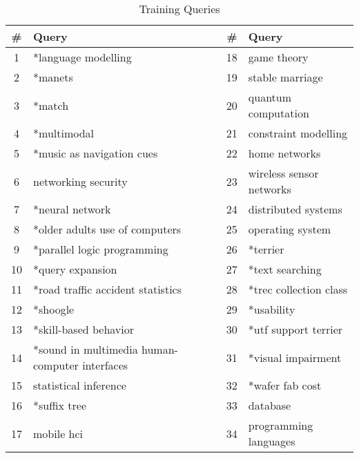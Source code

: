 \begin{table}
\centering
\begin{tabular}{|c|l|c|l|}
\hline \textbf{\#} & \textbf{Query} & \textbf{\#} & \textbf{Query} \\
\hline 1 & *language modelling & 18 & game theory\\
\hline 2 & *manets & 19 & stable marriage \\
\hline 3  & *match & 20 & quantum computation\\ 
\hline 4  & *multimodal & 21 & constraint modelling\\ 
\hline 5  & *music as navigation cues & 22 & home networks\\ 
\hline 6  & networking security & 23 & wireless sensor networks\\ 
\hline 7  & *neural network & 24 & distributed systems\\ 
\hline 8  & *older adults use of computers & 25 & operating system\\ 
\hline 9  & *parallel logic programming & 26 & *terrier\\ 
\hline 10  & *query expansion & 27 & *text searching\\ 
\hline 11  & *road traffic accident statistics & 28 & *trec collection class\\ 
\hline 12  & *shoogle & 29 & *usability\\ 
\hline 13  & *skill-based behavior & 30 & *utf support terrier\\ 
\hline 14  & *sound in multimedia human-computer interfaces & 31 & *visual impairment\\ 
\hline 15  & statistical inference & 32 & *wafer fab cost \\ 
\hline 16  & *suffix tree & 33 & database\\ 
\hline 17  & mobile hci & 34 & programming languages\\ 
\hline
\end{tabular}
\caption{Training Queries} \label{table:trainingqueries}
\end{table}

